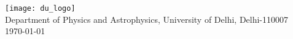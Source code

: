 \documentclass[12pt]{report}
\begin{document}
\begin{titlepage}
\begin{minipage}{0.4\textwidth}
	\end{minipage}
	
	\vfill %

	
	{\texttt{[image: du\_logo]}}
	\vspace{2mm}\\
 {Department of Physics and Astrophysics, University of Delhi, Delhi-110007}
 \vspace{2mm}\\
	 
	{\large\today} 
	\vfill %
	
\end{titlepage}
\end{document}
